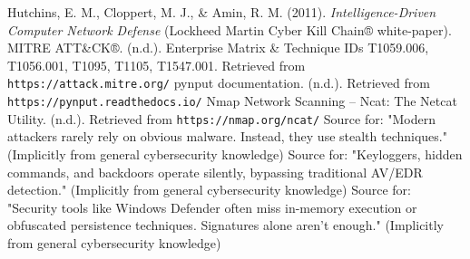 \documentclass[11pt]{article}
\begin{document}
	\newpage
	\begin{thebibliography}{9}
		 Hutchins, E. M., Cloppert, M. J., \& Amin, R. M. (2011). \textit{Intelligence-Driven Computer Network Defense} (Lockheed Martin Cyber Kill Chain® white-paper).
		 MITRE ATT\&CK®. (n.d.). Enterprise Matrix \& Technique IDs T1059.006, T1056.001, T1095, T1105, T1547.001. Retrieved from \texttt{https://attack.mitre.org/}
		 pynput documentation. (n.d.). Retrieved from \texttt{https://pynput.readthedocs.io/}
		 Nmap Network Scanning – Ncat: The Netcat Utility. (n.d.). Retrieved from \texttt{https://nmap.org/ncat/}
		 Source for: "Modern attackers rarely rely on obvious malware. Instead, they use stealth techniques." (Implicitly from general cybersecurity knowledge)
		 Source for: "Keyloggers, hidden commands, and backdoors operate silently, bypassing traditional AV/EDR detection." (Implicitly from general cybersecurity knowledge)
		 Source for: "Security tools like Windows Defender often miss in-memory execution or obfuscated persistence techniques. Signatures alone aren't enough." (Implicitly from general cybersecurity knowledge)
		
		
	\end{thebibliography}
	
\end{document}
